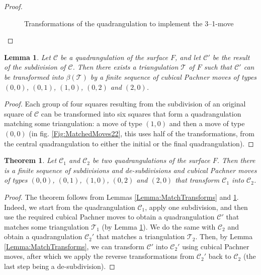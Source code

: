 \documentclass{amsart}
\newtheorem{theorem}{Theorem}
\newtheorem{lemma}{Lemma}
\begin{document}
\begin{proof}
\begin{figure}[ht]
\begin{center}
        \end{center}
        \caption{\label{Fig:MatchMoves31}Transformations of the quadrangulation to implement the 3--1-move}
    \end{figure}
\end{proof}

\begin{lemma}
    \label{Lemma:Subdivide}
    Let $\mathcal{C}$ be a quadrangulation of the surface $F$, and let $\mathcal{C}'$ be the result of the subdivision of $\mathcal{C}$. Then there exists a triangulation $\mathcal{T}$ of $F$ such that $\mathcal{C}'$ can be transformed into $\beta(\mathcal{T})$ by a finite sequence of cubical Pachner moves of types $(0, 0)$, $(0, 1)$, $(1, 0)$, $(0, 2)$ and $(2, 0)$.
\end{lemma}
\begin{proof}
    Each group of four squares resulting from the subdivision of an original square of $\mathcal{C}$ can be transformed into six squares that form a quadrangulation matching some triangulation: a move of type $(1, 0)$ and then a move of type $(0, 0)$ (in fig. \ref{Fig:MatchedMoves22}, this uses half of the transformations, from the central quadrangulation to either the initial or the final quadrangulation).
\end{proof}

\begin{theorem}
    \label{Theorem:Transforms}
    Let $\mathcal{C}_1$ and $\mathcal{C}_2$ be two quadrangulations of the surface $F$. Then there is a finite sequence of subdivisions and de-subdivisions and cubical Pachner moves of types $(0, 0)$, $(0, 1)$, $(1, 0)$, $(0, 2)$ and $(2, 0)$ that transform $\mathcal{C}_1$ into $\mathcal{C}_2$.
\end{theorem}
\begin{proof}
    The theorem follows from Lemmas \ref{Lemma:MatchTransforms} and \ref{Lemma:Subdivide}. Indeed, we start from the quadrangulation $\mathcal{C}_1$, apply one subdivision, and then use the required cubical Pachner moves to obtain a quadrangulation $\mathcal{C}'$ that matches some triangulation $\mathcal{T}_1$ (by Lemma \ref{Lemma:Subdivide}). We do the same with $\mathcal{C}_2$ and obtain a quadrangulation $\mathcal{C}_2'$ that matches a triangulation $\mathcal{T}_2$. Then, by Lemma \ref{Lemma:MatchTransforms}, we can transform $\mathcal{C}'$ into $\mathcal{C}_2'$ using cubical Pachner moves, after which we apply the reverse transformations from $\mathcal{C}_2'$ back to $\mathcal{C}_2$ (the last step being a de-subdivision).
\end{proof}
\end{document}
